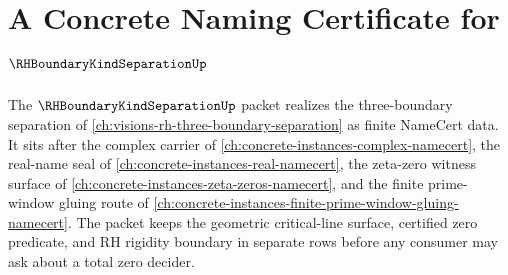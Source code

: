 \chapter{A Concrete Naming Certificate for $\RHBoundaryKindSeparationUp$}
\label{ch:concrete-instances-rh-boundary-kind-separation-namecert}

The $\RHBoundaryKindSeparationUp$ packet realizes the three-boundary separation of \autoref{ch:visions-rh-three-boundary-separation} as finite NameCert data. It sits after the complex carrier of \autoref{ch:concrete-instances-complex-namecert}, the real-name seal of \autoref{ch:concrete-instances-real-namecert}, the zeta-zero witness surface of \autoref{ch:concrete-instances-zeta-zeros-namecert}, and the finite prime-window gluing route of \autoref{ch:concrete-instances-finite-prime-window-gluing-namecert}. The packet keeps the geometric critical-line surface, certified zero predicate, and RH rigidity boundary in separate rows before any consumer may ask about a total zero decider.

